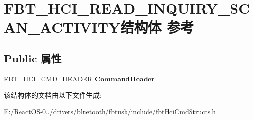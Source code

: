 \hypertarget{struct_f_b_t___h_c_i___r_e_a_d___i_n_q_u_i_r_y___s_c_a_n___a_c_t_i_v_i_t_y}{}\section{F\+B\+T\+\_\+\+H\+C\+I\+\_\+\+R\+E\+A\+D\+\_\+\+I\+N\+Q\+U\+I\+R\+Y\+\_\+\+S\+C\+A\+N\+\_\+\+A\+C\+T\+I\+V\+I\+T\+Y结构体 参考}
\label{struct_f_b_t___h_c_i___r_e_a_d___i_n_q_u_i_r_y___s_c_a_n___a_c_t_i_v_i_t_y}
\subsection*{Public 属性}
\begin{DoxyCompactItemize}
\item 
\mbox{\label{struct_f_b_t___h_c_i___r_e_a_d___i_n_q_u_i_r_y___s_c_a_n___a_c_t_i_v_i_t_y_a92881f4f604f991a8de7a3bb4fb03cde}} 
\hyperlink{struct_f_b_t___h_c_i___c_m_d___h_e_a_d_e_r}{F\+B\+T\+\_\+\+H\+C\+I\+\_\+\+C\+M\+D\+\_\+\+H\+E\+A\+D\+ER} {\bfseries Command\+Header}
\end{DoxyCompactItemize}


该结构体的文档由以下文件生成\+:\begin{DoxyCompactItemize}
\item 
E\+:/\+React\+O\+S-\/0../drivers/bluetooth/fbtusb/include/fbt\+Hci\+Cmd\+Structs.\+h\end{DoxyCompactItemize}
